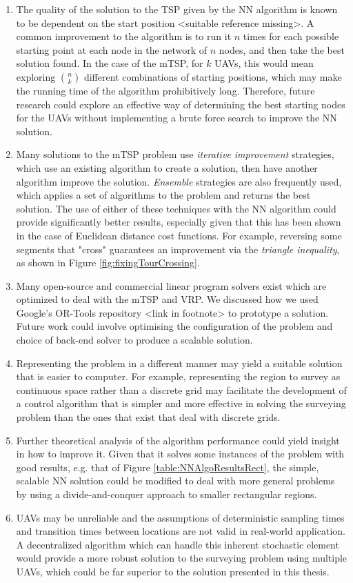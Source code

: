 \begin{enumerate}
    \item The quality of the solution to the TSP given by the NN algorithm is known to be dependent on the start position <suitable reference missing>. A common improvement to the algorithm is to run it $n$ times for each possible starting point at each node in the network of $n$ nodes, and then take the best solution found. In the case of the mTSP, for $k$ UAVs, this would mean exploring ${n \choose k}$ different combinations of starting positions, which may make the running time of the algorithm prohibitively long. Therefore, future research could explore an effective way of determining the best starting nodes for the UAVs without implementing a brute force search to improve the NN solution.
    \item Many solutions to the mTSP problem use \textit{iterative improvement} strategies,  which use an existing algorithm to create a solution, then have another algorithm improve the solution.\textit{ Ensemble} strategies are also frequently used, which applies a set of algorithms to the  problem and returns the best solution. The use of either of these techniques with the NN algorithm could provide significantly better results, especially given that this has been shown in the case of Euclidean distance cost functions. For example, reversing some segments that "cross" guarantees an improvement via the \textit{triangle inequality}, as shown in Figure \ref{fig:fixingTourCrossing}. 
    \item Many open-source and commercial linear program solvers exist which are optimized to deal with the mTSP and VRP. We discussed how we used Google's OR-Tools repository <link in footnote> to prototype a solution. Future work could involve optimising the configuration of the problem and choice of back-end solver to produce a scalable solution.
    \item Representing the problem in a different manner may yield a suitable solution that is easier to computer. For example, representing the region to survey as continuous space rather than a discrete grid may facilitate the development of a control algorithm that is simpler and more effective in solving the surveying problem than the ones that exist that deal with discrete grids.
    \item Further theoretical analysis of the algorithm performance could yield insight in how to improve it. Given that it solves some instances of the problem with good results, e.g. that of Figure \ref{table:NNAlgoResultsRect}, the simple, scalable NN solution could be modified to deal with more general problems by using a divide-and-conquer approach to smaller rectangular regions.
    \item UAVs may be unreliable and the assumptions of deterministic sampling times and transition times between locations are not valid in real-world application. A decentralized algorithm which can handle this inherent stochastic element would provide a more robust solution to the surveying problem using multiple UAVs, which could be far superior to the solution presented in this thesis.
    
    
\end{enumerate}


